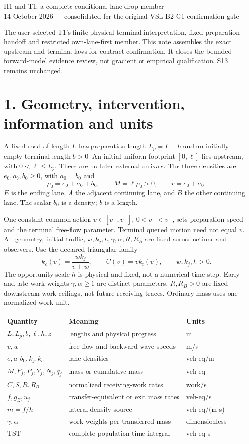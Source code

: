 \documentclass[11pt,a4paper]{article}
\begin{document}
\begin{center}
{\Large H1 and T1: a complete conditional lane-drop member}\\[4pt]
14 October 2026 --- consolidated for the original VSL-B2-G1 confirmation gate
\end{center}

The user selected T1's finite physical terminal interpretation, fixed
preparation handoff and restricted own-lane-first member. This note assembles
the exact upstream and terminal laws for contract confirmation. It closes
the bounded forward-model evidence review, not gradient or empirical
qualification. S13 remains unchanged.

\section*{1. Geometry, intervention, information and units}
A fixed road of length $L$ has preparation length $L_p=L-b$ and an initially
empty terminal length $b>0$. An initial uniform footprint $[0,\ell]$ lies
upstream, with $0<\ell\leq L_p$. There are no later external arrivals.
The three densities are $e_0,a_0,b_0\geq0$, with $a_0=b_0$ and
\[
 \rho_0=e_0+a_0+b_0,\qquad M=\ell\rho_0>0,\qquad r=e_0+a_0.
 \tag{1}
\]
$E$ is the ending lane, $A$ the adjacent continuing lane, and $B$ the other
continuing lane. The scalar $b_0$ is a density; $b$ is a length.

One constant common action $v\in[v_-,v_+]$, $0<v_-<v_+$, sets preparation
speed and the terminal free-flow parameter. Terminal queued motion need not
equal $v$. All geometry, initial traffic, $w,k_j,h,\gamma,\alpha,R,R_B$
are fixed across actions and observers. Use the declared triangular family
\[
 k_c(v)=\frac{wk_j}{v+w},\qquad C(v)=v k_c(v),\qquad w,k_j,h>0.
 \tag{2}
\]
The opportunity scale $h$ is physical and fixed, not a numerical time step.
Early and late work weights $\gamma,\alpha\geq1$ are distinct parameters.
$R,R_B>0$ are fixed downstream work ceilings, not future receiving traces.
Ordinary mass uses one normalized work unit.

\begin{center}
\begin{tabular}{lll}
\toprule
Quantity & Meaning & Units\\
\midrule
$L,L_p,b,\ell,h,z$ & lengths and physical progress & m\\
$v,w$ & free-flow and backward-wave speeds & m/s\\
$e,a,b_0,k_j,k_c$ & lane densities & veh-eq/m\\
$M,F_j,P_j,Y_j,N_j,q_j$ & mass or cumulative mass & veh-eq\\
$C,S,R,R_B$ & normalized receiving-work rates & work/s\\
$f,g_E,u_j$ & transfer-equivalent or exit mass rates & veh-eq/s\\
$m=f/h$ & lateral density source & veh-eq/(m s)\\
$\gamma,\alpha$ & work weights per transferred mass & dimensionless\\
$\mathrm{TST}$ & complete population-time integral & veh-eq s\\
\bottomrule
\end{tabular}
\end{center}
\end{document}
